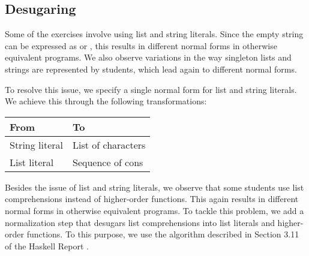 



\subsection{Desugaring}

Some of the exercises involve using list and string literals. Since the empty string can be expressed as  or \haskell{[]}, this results in different normal forms in otherwise equivalent programs. We also observe variations in the way singleton lists and strings are represented by students, which lead again to different normal forms.

To resolve this issue, we specify a single normal form for list and string literals. We achieve this through the following transformations:

\begin{center}
\begin{tabular}{ m{10em} | m{10em} }
    From & To \\
    \hline
    String literal & List of characters \\
    \hline
    List literal & Sequence of cons
\end{tabular}
\end{center}

Besides the issue of list and string literals, we observe that some students use list comprehensions instead of higher-order functions. This again results in different normal forms in otherwise equivalent programs. To tackle this problem, we add a normalization step that desugars list comprehensions into list literals and higher-order functions. To this purpose, we use the algorithm described in Section 3.11 of the Haskell Report \cite{2010haskell}.

